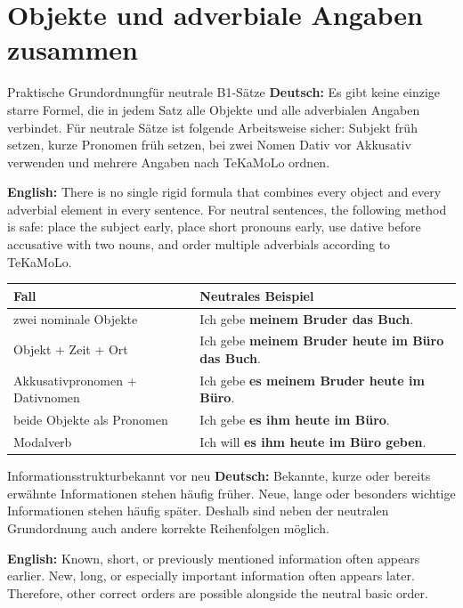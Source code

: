 \documentclass[a4paper,11pt]{article}
\newcommand{\GermanText}[1]{\textbf{Deutsch: }#1\par}
\newcommand{\EnglishText}[1]{{\small\color{SoftGray}\textbf{English: }#1\par}}
\newcommand{\TableHeader}[1]{\color{white}\textbf{#1}}
\begin{document}
    
    \section{Objekte und adverbiale Angaben zusammen}
        
        \begin{grammarentry}{Praktische Grundordnung}{für neutrale B1-Sätze}
            \GermanText{Es gibt keine einzige starre Formel, die in jedem Satz alle Objekte und alle adverbialen Angaben verbindet. Für neutrale Sätze ist folgende Arbeitsweise sicher: Subjekt früh setzen, kurze Pronomen früh setzen, bei zwei Nomen Dativ vor Akkusativ verwenden und mehrere Angaben nach TeKaMoLo ordnen.}
            \EnglishText{There is no single rigid formula that combines every object and every adverbial element in every sentence. For neutral sentences, the following method is safe: place the subject early, place short pronouns early, use dative before accusative with two nouns, and order multiple adverbials according to TeKaMoLo.}
        \end{grammarentry}
        
        \begin{longtable}{|p{4.4cm}|p{10.0cm}|}
            \hline
            \rowcolor{HeaderBlueDark}
            \TableHeader{Fall} & \TableHeader{Neutrales Beispiel} \\
            \hline
            zwei nominale Objekte & Ich gebe \textbf{meinem Bruder das Buch}. \\
            \hline
            Objekt + Zeit + Ort & Ich gebe \textbf{meinem Bruder heute im Büro das Buch}. \\
            \hline
            Akkusativpronomen + Dativnomen & Ich gebe \textbf{es meinem Bruder heute im Büro}. \\
            \hline
            beide Objekte als Pronomen & Ich gebe \textbf{es ihm heute im Büro}. \\
            \hline
            Modalverb & Ich will \textbf{es ihm heute im Büro geben}. \\
            \hline
        \end{longtable}
        
        \begin{grammarentry}{Informationsstruktur}{bekannt vor neu}
            \GermanText{Bekannte, kurze oder bereits erwähnte Informationen stehen häufig früher. Neue, lange oder besonders wichtige Informationen stehen häufig später. Deshalb sind neben der neutralen Grundordnung auch andere korrekte Reihenfolgen möglich.}
            \EnglishText{Known, short, or previously mentioned information often appears earlier. New, long, or especially important information often appears later. Therefore, other correct orders are possible alongside the neutral basic order.}
        \end{grammarentry}
    
\end{document}
